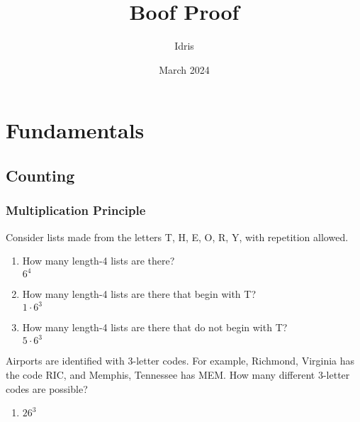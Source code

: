 \documentclass[openany, 11pt]{book}
\title{Boof Proof}
\author{Idris}
\date{March 2024}
\begin{document}
\maketitle{}
\tableofcontents

\part{Fundamentals}
\setcounter{chapter}{2}
\chapter{Counting}
\setcounter{section}{1}
\section{Multiplication Principle}
\begin{exercise}{}{}
	Consider lists made from the letters T, H, E, O, R, Y,
	with repetition allowed.
	\begin{enumerate}[label = {(\arabic*)}]
		\item How many length-4 lists are there? \\
		      $6^4$
		\item How many length-4 lists are there that begin with T?\\
		      $1 \cdot 6^3$
		\item How many length-4 lists are there that do not begin with T?\\
		      $5 \cdot 6^3$
	\end{enumerate}
\end{exercise}

\begin{exercise}{}{}
	Airports are identified with 3-letter codes. For example,
	Richmond, Virginia has the code RIC, and Memphis, Tennessee has MEM. How
	many different 3-letter codes are possible?
	\begin{enumerate}[label = {(\arabic*)}]
		\item $26^3$
	\end{enumerate}
\end{exercise}
\end{document}
